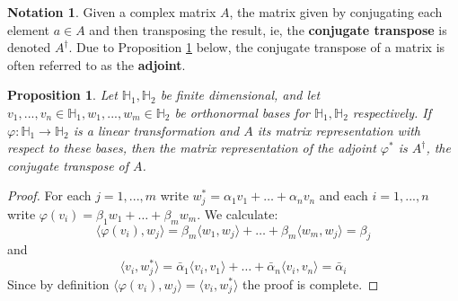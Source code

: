 \documentclass[12pt]{article}
\theoremstyle{plain}
\newtheorem{proposition}[thm]{Proposition}
\theoremstyle{definition}
\newtheorem{notation}[thm]{Notation}
\newcommand{\bb}[1]{\mathbb{#1}}
\newcommand{\lto}{\longrightarrow}
\begin{document}
\begin{notation}
Given a complex matrix $A$, the matrix given by conjugating each element $a \in A$ and then transposing the result, ie, the \textbf{conjugate transpose} is denoted $A^{\dagger}$. Due to Proposition \ref{prop:transpose_matrix} below, the conjugate transpose of a matrix is often referred to as the \textbf{adjoint}.
\end{notation}
\begin{proposition}\label{prop:transpose_matrix}
Let $\bb{H}_1,\bb{H}_2$ be finite dimensional, and let $v_1,...,v_n \in \bb{H}_1, w_1,...,w_m\in \bb{H}_2$ be orthonormal bases for $\bb{H}_1,\bb{H}_2$ respectively. If $\varphi: \bb{H}_1 \lto \bb{H}_2$ is a linear transformation and $A$ its matrix representation with respect to these bases, then the matrix representation of the adjoint $\varphi^\ast$ is $A^\dagger$, the conjugate transpose of $A$.
\end{proposition}
\begin{proof}
For each $j = 1,...,m$ write $w_j^\ast = \alpha_1 v_1 + \hdots + \alpha_n v_n$ and each $i = 1,...,n$ write $\varphi(v_i) = \beta_1 w_1 + \hdots + \beta_m w_m$. We calculate:
\begin{equation}
\langle \varphi(v_i), w_j\rangle = \beta_m \langle w_1, w_j \rangle + \hdots + \beta_m \langle w_m, w_j\rangle = \beta_j
\end{equation}
and
\begin{equation}
\langle v_i, w_j^\ast\rangle = \bar{\alpha}_1 \langle v_i, v_1\rangle + \hdots + \bar{\alpha}_n \langle v_i, v_n \rangle = \bar{\alpha}_i
\end{equation}
Since by definition $\langle \varphi(v_i), w_j\rangle = \langle v_i, w_j^\ast\rangle$ the proof is complete.
\end{proof}
\end{document}
